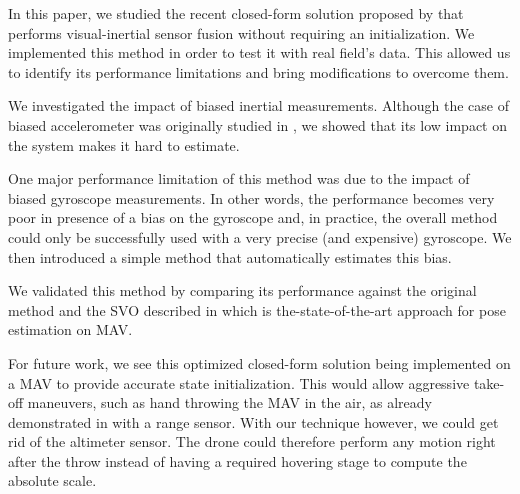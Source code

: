 \documentclass[letterpaper, 10 pt, conference]{ieeeconf}  %
\begin{document}
In this paper, we studied the recent closed-form solution proposed by \cite{Martinelli2014} that performs visual-inertial sensor fusion without requiring an initialization.
We implemented this method in order to test it with real field's data.
This allowed us to identify its performance limitations and bring modifications to overcome them.

We investigated the impact of biased inertial measurements.
Although the case of biased accelerometer was originally studied in \cite{Martinelli2014}, we showed that its low impact on the system makes it hard to estimate.

One major performance limitation of this method was due to the impact of biased gyroscope measurements.
In other words, the performance becomes very poor in presence of a bias on the gyroscope and, in practice, the overall method could only be successfully used with a very precise (and expensive) gyroscope.
We then introduced a simple method that automatically estimates this bias.



We validated this method by comparing its performance against the original method and the SVO described in \cite{FaesslerICRA15} which is the-state-of-the-art approach for pose estimation on MAV.

For future work, we see this optimized closed-form solution being implemented on a MAV to provide accurate state initialization.
This would allow aggressive take-off maneuvers, such as hand throwing the MAV in the air, as already demonstrated in \cite{Faessler2015} with a range sensor.
With our technique however, we could get rid of the altimeter sensor.
The drone could therefore perform any motion right after the throw instead of having a required hovering stage to compute the absolute scale.



\end{document}

